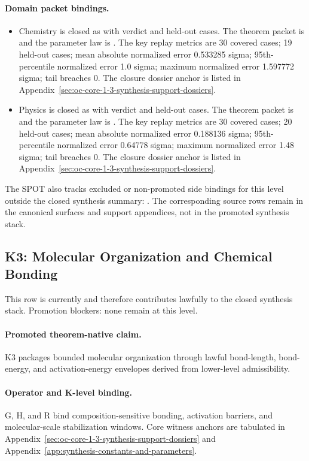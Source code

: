 \paragraph{Domain packet bindings.}
\begin{itemize}[leftmargin=1.6em,nosep]
\item Chemistry is closed as  with verdict  and  held-out cases. The theorem packet is  and the parameter law is . The key replay metrics are 30 covered cases; 19 held-out cases; mean absolute normalized error 0.533285 sigma; 95th-percentile normalized error 1.0 sigma; maximum normalized error 1.597772 sigma; tail breaches 0. The closure dossier anchor is listed in Appendix~\ref{sec:oc-core-1-3-synthesis-support-dossiers}.
\item Physics is closed as  with verdict  and  held-out cases. The theorem packet is  and the parameter law is . The key replay metrics are 30 covered cases; 20 held-out cases; mean absolute normalized error 0.188136 sigma; 95th-percentile normalized error 0.64778 sigma; maximum normalized error 1.48 sigma; tail breaches 0. The closure dossier anchor is listed in Appendix~\ref{sec:oc-core-1-3-synthesis-support-dossiers}.
\end{itemize}
The SPOT also tracks  excluded or non-promoted side bindings for this level outside the closed synthesis summary: . The corresponding source rows remain in the canonical surfaces and support appendices, not in the promoted synthesis stack.

\subsection{K3: Molecular Organization and Chemical Bonding}
\label{sec:oc-core-1-3-synthesis-k3}
This row is currently  and therefore contributes lawfully to the closed synthesis stack.
Promotion blockers: none remain at this level.

\paragraph{Promoted theorem-native claim.}
K3 packages bounded molecular organization through lawful bond-length, bond-energy, and activation-energy envelopes derived from lower-level admissibility.

\paragraph{Operator and K-level binding.}
G, H, and R bind composition-sensitive bonding, activation barriers, and molecular-scale stabilization windows.
Core witness anchors are tabulated in Appendix~\ref{sec:oc-core-1-3-synthesis-support-dossiers} and Appendix~\ref{app:synthesis-constants-and-parameters}.

